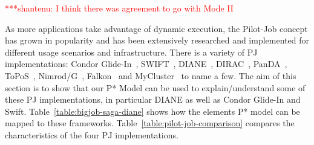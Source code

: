 \documentclass[conference,final]{IEEEtran}
\newcommand{\jhanote}[1]{ {\textcolor{red} { ***shantenu: #1 }}}
\newcommand{\jhanote}[1]{}
\begin{document}
\jhanote{I think there was agreement to go with Mode II}

As more applications take advantage of dynamic execution, the Pilot-Job concept
has grown in popularity and has been extensively researched and implemented for
different usage scenarios and infrastructure. There is a variety of PJ
implementations: Condor Glide-In~\cite{condor-g}, SWIFT~\cite{Wilde2011},
DIANE~\cite{Moscicki:908910}, DIRAC~\cite{1742-6596-219-6-062049},
PanDA~\cite{1742-6596-219-6-062041}, ToPoS~\cite{topos},
Nimrod/G~\cite{10.1109/HPC.2000.846563}, Falkon~\cite{1362680} and
MyCluster~\cite{1652061} to name a few. The aim of this section is to show that
our P* Model can be used to explain/understand some of these PJ implementations,
in particular DIANE as well as Condor Glide-In and Swift.
Table~\ref{table:bigjob-saga-diane} shows how the elements P* model can be
mapped to these frameworks. Table~\ref{table:pilot-job-comparison} compares the
characteristics of the four PJ implementations.


\end{document}
